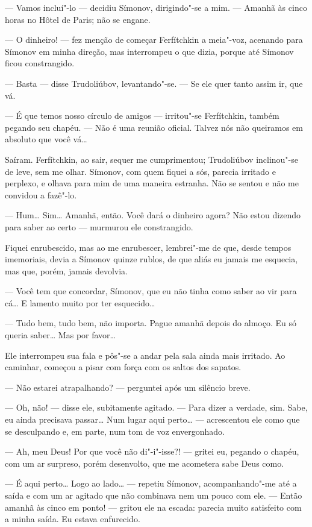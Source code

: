 --- Vamos incluí"-lo --- decidiu Símonov, dirigindo"-se a mim. --- Amanhã às
cinco horas no Hôtel de Paris; não se engane.

--- O dinheiro! --- fez menção de começar Ferfítchkin a meia"-voz, acenando
para Símonov em minha direção, mas interrompeu o que dizia, porque até
Símonov ficou constrangido.

--- Basta --- disse Trudoliúbov, levantando"-se. --- Se ele quer tanto assim
ir, que vá.

--- É que temos nosso círculo de amigos --- irritou"-se Ferfítchkin, também
pegando seu chapéu. --- Não é uma reunião oficial. Talvez nós não
queiramos em absoluto que você vá\ldots{}

Saíram. Ferfítchkin, ao sair, sequer me cumprimentou; Trudoliúbov
inclinou"-se de leve, sem me olhar. Símonov, com quem fiquei a sós,
parecia irritado e perplexo, e olhava para mim de uma maneira estranha.
Não se sentou e não me convidou a fazê"-lo.

--- Hum\ldots{} Sim\ldots{} Amanhã, então. Você dará o dinheiro agora? Não estou
dizendo para saber ao certo --- murmurou ele constrangido.

Fiquei enrubescido, mas ao me enrubescer, lembrei"-me de que, desde
tempos imemoriais, devia a Símonov quinze rublos, de que aliás eu
jamais me esquecia, mas que, porém, jamais devolvia.

--- Você tem que concordar, Símonov, que eu não tinha como saber ao vir
para cá\ldots{} E lamento muito por ter esquecido\ldots{}

--- Tudo bem, tudo bem, não importa. Pague amanhã depois do almoço. Eu só
queria saber\ldots{} Mas por favor\ldots{}

Ele interrompeu sua fala e pôs"-se a andar pela sala ainda mais irritado.
Ao caminhar, começou a pisar com força com os saltos dos sapatos.

--- Não estarei atrapalhando? --- perguntei após um silêncio breve.

--- Oh, não! --- disse ele, subitamente agitado. --- Para dizer a verdade,
sim. Sabe, eu ainda precisava passar\ldots{} Num lugar aqui perto\ldots{} ---
acrescentou ele como que se desculpando e, em parte, num tom de voz
envergonhado.

--- Ah, meu Deus! Por que você não di"-i"-isse?! --- gritei eu, pegando o
chapéu, com um ar surpreso, porém desenvolto, que me acometera sabe Deus
como.

--- É aqui perto\ldots{} Logo ao lado\ldots{} --- repetiu Símonov, acompanhando"-me até
a saída e com um ar agitado que não combinava nem um pouco com ele. ---
Então amanhã às cinco em ponto! --- gritou ele na escada: parecia muito
satisfeito com a minha saída. Eu estava enfurecido.


